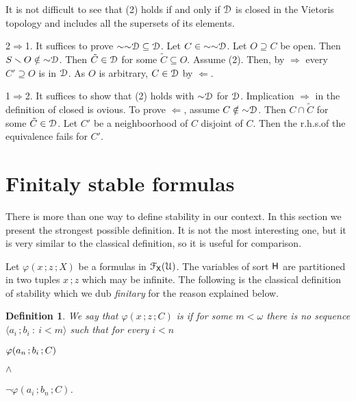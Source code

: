 \documentclass{amsproc}
\makeatletter
\newcounter{thm}
\theoremstyle{mio}
\newtheorem{definition}[thm]{Definition}\tcolorboxenvironment{definition}{mythm}
\providecommand{\proofNameStyle}{\bfseries}
\renewenvironment{proof}[1][\proofname]{\par
  \pushQED{\qed}%
  \normalfont%
  \trivlist
  \item[\hskip\labelsep
        \proofNameStyle
    #1\@addpunct{.}]\ignorespaces
}{%
  \popQED\endtrivlist\@endpefalse
}
\renewcommand*{\emph}[1]{%
   \smash{\tikz[baseline]\node[rectangle, fill=teal!25, rounded corners, inner xsep=0.5ex, inner ysep=0.2ex, anchor=base, minimum height = 2.7ex]{\strut #1};}}
\makeatother
\begin{document}
It is not difficult to see that (2) holds if and only if ${\EuScript D}$ is closed in the Vietoris topology and includes all the supersets of its elements.

\begin{proof}
  2$\Rightarrow$1.
  It suffices to prove ${\sim}{\sim}{\EuScript D}\subseteq{\EuScript D}$.
  Let $C\in{\sim}{\sim}{\EuScript D}$.
  Let $O\supseteq C$ be open.
  Then $S\smallsetminus O\notin{\sim}{\EuScript D}$.
  Then $\tilde C\in{\EuScript D}$ for some $\tilde C\subseteq O$.
  Assume (2).
  Then, by $\Rightarrow$ every $C'\supseteq O$ is in ${\EuScript D}$.
  As $O$ is arbitrary, $C\in {\EuScript D}$ by $\Leftarrow$.

  1$\Rightarrow$2.
  It suffices to show that (2) holds with ${\sim}{\EuScript D}$ for ${\EuScript D}$.
  Implication $\Rightarrow$ in the definition of closed is ovious.
  To prove $\Leftarrow$, assume $C\notin{\sim}{\EuScript D}$.
  Then $C\cap\tilde C$ for some $\tilde C\in{\EuScript D}$.
  Let $C'$ be a neighboorhood of $C$ disjoint of $C$.
  Then the r.h.s.\@ of the equivalence fails for $C'$.  
\end{proof}


\section{Finitaly stable formulas}
\def\medrel#1{\parbox{5ex}{\hfil $#1$}}
\def\ceq#1#2#3{\parbox[t]{22ex}{$\displaystyle #1$}\medrel{#2}{$\displaystyle #3$}}

There is more than one way to define stability in our context.
In this section we present the strongest possible definition.
It is not the most interesting one, but it is very similar to the classical definition, so it is useful for comparison.

Let $\varphi(x\,;z\,;X)$ be a formulas in ${\EuScript F}_{\sf X}({\EuScript U})$.
The variables of sort ${\sf H}$ are partitioned in two tuples $x\,;z$ which may be infinite.
The following is the classical definition of stability which we dub \textit{finitary\/} for the reason explained below.

\begin{definition}\label{def_finitary_stable}
We say that $\varphi(x\,;z\,;C)$ is  \emph{finitarily stable\/} if for some $m<\omega$ there is no sequence $\langle a_i\,;b_i\ :\ i<m\rangle$ such that for every $i<n$\smallskip

\ceq{\hfill \varphi(a_n\,;b_i\,;C)}{\wedge}{\neg\varphi(a_i\,;b_n\,;C)}.
\end{definition}
\end{document}
